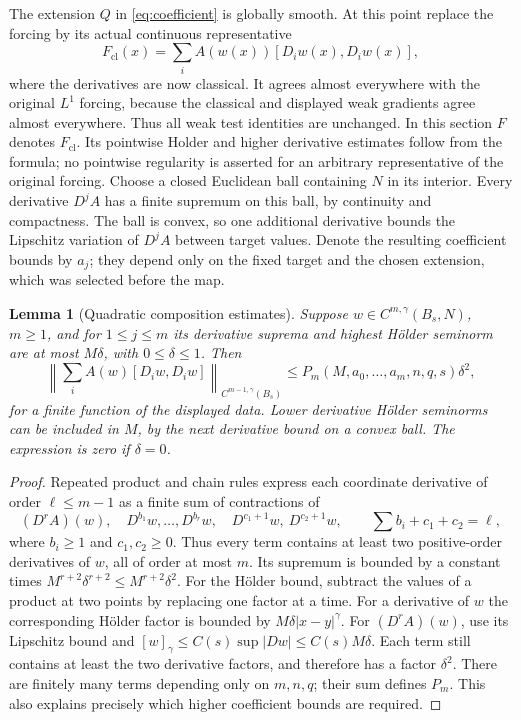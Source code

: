 \documentclass[11pt,a4paper]{article}
\numberwithin{equation}{section}
\newtheorem{lemma}[theorem]{Lemma}
\theoremstyle{definition}
\theoremstyle{remark}
\begin{document}
The extension \(Q\) in \eqref{eq:coefficient} is globally smooth.
At this point replace the forcing by its actual continuous representative
\begin{equation}\label{eq:forcingrepresentative}
 F_{\mathrm{cl}}(x)=\sum_i A(w(x))[D_iw(x),D_iw(x)],
\end{equation}
where the derivatives are now classical. It agrees almost everywhere with
the original \(L^1\) forcing, because the classical and displayed weak
gradients agree almost everywhere. Thus all weak test identities are
unchanged. In this section \(F\) denotes \(F_{\mathrm{cl}}\). Its pointwise
Holder and higher derivative estimates follow from the formula; no pointwise
regularity is asserted for an arbitrary representative of the original forcing.
Choose a closed Euclidean ball containing \(N\) in its interior. Every
derivative \(D^jA\) has a finite supremum on this ball, by continuity and
compactness. The ball is convex, so one additional derivative bounds the
Lipschitz variation of \(D^jA\) between target values. Denote the resulting
coefficient bounds by \(a_j\); they depend only on the fixed target and
the chosen extension, which was selected before the map.

\begin{lemma}[Quadratic composition estimates]
\label{lem:nonlinear}
Suppose \(w\in C^{m,\gamma}(B_s,N)\), \(m\ge1\), and for
\(1\le j\le m\) its derivative suprema and highest H\"older seminorm
are at most \(M\delta\), with \(0\le\delta\le1\). Then
\begin{equation}\label{eq:nonlinear}
 \left\|\sum_i A(w)[D_iw,D_iw]\right\|_{C^{m-1,\gamma}(B_s)}
 \le P_m(M,a_0,\ldots,a_m,n,q,s)\delta^2,
\end{equation}
for a finite function of the displayed data. Lower derivative H\"older
seminorms can be included in \(M\), by the next derivative bound on a
convex ball. The expression is zero if \(\delta=0\).
\end{lemma}
\begin{proof}
Repeated product and chain rules express each coordinate derivative of
order \(\ell\le m-1\) as a finite sum of contractions of
\[
 (D^rA)(w),\quad D^{b_1}w,\ldots,D^{b_r}w,
 \quad D^{c_1+1}w,\ D^{c_2+1}w,
 \qquad \sum b_i+c_1+c_2=\ell,
\]
where \(b_i\ge1\) and \(c_1,c_2\ge0\). Thus every term contains at
least two positive-order derivatives of \(w\), all of order at most
\(m\). Its supremum is bounded by a constant times
\(M^{r+2}\delta^{r+2}\le M^{r+2}\delta^2\).
For the H\"older bound, subtract the values of a product at two points
by replacing one factor at a time. For a derivative of \(w\) the
corresponding H\"older factor is bounded by \(M\delta|x-y|^\gamma\).
For \((D^rA)(w)\), use its Lipschitz bound and
\([w]_\gamma\le C(s)\sup|Dw|\le C(s)M\delta\).
Each term still contains at least the two derivative factors, and therefore
has a factor \(\delta^2\). There are finitely many terms depending only
on \(m,n,q\); their sum defines \(P_m\). This also explains precisely
which higher coefficient bounds are required.
\end{proof}
\end{document}
